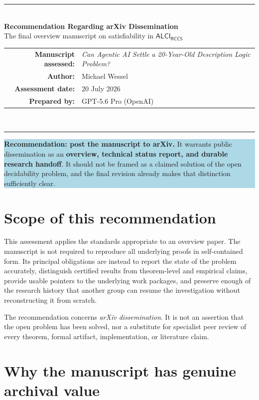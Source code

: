 \documentclass[11pt]{article}
\newcommand{\logic}{\ensuremath{\mathsf{ALCI}_{\mathsf{RCC5}}}\xspace}
\newcommand{\fboxtext}[1]{%
  \begin{center}
  \setlength{\fboxsep}{10pt}%
  \colorbox{lightblue}{\parbox{0.91\textwidth}{#1}}
  \end{center}
}
\begin{document}
\begin{center}
  {\color{navy}\rule{\textwidth}{1.1pt}}\\[1.1em]
  {\LARGE\bfseries\color{navy}Recommendation Regarding arXiv Dissemination}\\[0.55em]
  {\large The final overview manuscript on satisfiability in \logic}\\[1.05em]
  \begin{tabular}{@{}rl@{}}
    \textbf{Manuscript assessed:} & \emph{Can Agentic AI Settle a 20-Year-Old Description Logic Problem?}\\
    \textbf{Author:} & Michael Wessel\\
    \textbf{Assessment date:} & 20 July 2026\\
    \textbf{Prepared by:} & GPT-5.6 Pro (OpenAI)\\
  \end{tabular}\\[1.0em]
  {\color{navy}\rule{\textwidth}{1.1pt}}
\end{center}

\fboxtext{%
\textbf{Recommendation: post the manuscript to arXiv.} It warrants public dissemination as an \textbf{overview, technical status report, and durable research handoff}. It should not be framed as a claimed solution of the open decidability problem, and the final revision already makes that distinction sufficiently clear.}

\section{Scope of this recommendation}

This assessment applies the standards appropriate to an overview paper. The manuscript is not required to reproduce all underlying proofs in self-contained form. Its principal obligations are instead to report the state of the problem accurately, distinguish certified results from theorem-level and empirical claims, provide usable pointers to the underlying work packages, and preserve enough of the research history that another group can resume the investigation without reconstructing it from scratch.

The recommendation concerns \emph{arXiv dissemination}. It is not an assertion that the open problem has been solved, nor a substitute for specialist peer review of every theorem, formal artifact, implementation, or literature claim.

\section{Why the manuscript has genuine archival value}
\end{document}

